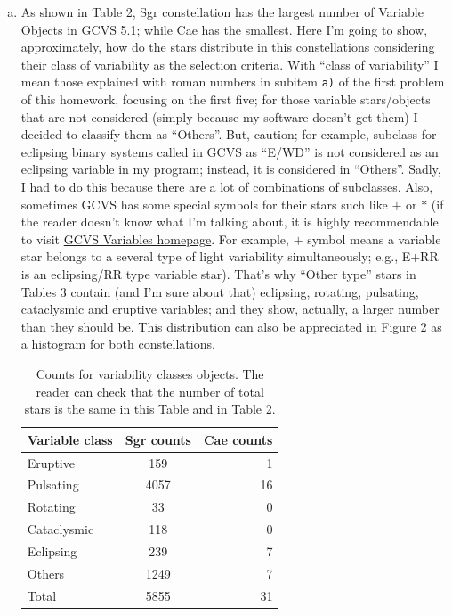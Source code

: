 \begin{enumerate} [a)]
\item As shown in Table 2, Sgr constellation has the largest number of Variable Objects in GCVS 5.1; while Cae has the smallest. Here I'm going to show, approximately, how 	do the stars distribute in this constellations considering their class of variability as the selection criteria. With ``class of variability'' I mean those explained with roman numbers in subitem \texttt{a)} of the first problem of this homework, focusing on the first five; for those variable stars/objects that are not considered (simply because my software doesn't get them) I decided to classify them as ``Others''. But, caution; for example, subclass for eclipsing binary systems called in GCVS as ``E/WD'' is not considered as an eclipsing variable in my program; instead, it is considered in ``Others''. Sadly, I had to do this because there are a lot of combinations of subclasses. Also, sometimes GCVS has some special symbols for their stars such like $+$ or $*$ (if the reader doesn't know what I'm talking about, it is highly recommendable to visit \href{http://www.sai.msu.su/gcvs/gcvs/gcvs5/vartype.htm}{GCVS Variables homepage}. For example, $+$ symbol means a variable star belongs to a several type of light variability simultaneously; e.g., E+RR is an eclipsing/RR type variable star). That's why ``Other type'' stars in Tables 3 contain (and I'm sure about that) eclipsing, rotating, pulsating, cataclysmic and eruptive variables; and they show, actually, a larger number than they should be. This distribution can also be appreciated in Figure 2 as a histogram for both constellations.

\begin{table}[ht]
\centering
\caption{\label{table:parameters} Counts for variability classes objects. The reader can check that the number of total stars is the same in this Table and in Table 2.}
\begin{tabular}{lcr}
\hline
\hline
Variable class                          & Sgr counts & Cae counts     \\
\hline
 Eruptive  &  159   &  1 \\
 Pulsating & 4057 & 16 \\
 Rotating & 33 & 0 \\
 Cataclysmic & 118 & 0 \\
 Eclipsing & 239 & 7 \\
 Others & 1249 & 7 \\
\hline
 Total & 5855 & 31 \\
\hline
\end{tabular}
\end{table}



  
\end{enumerate} 

